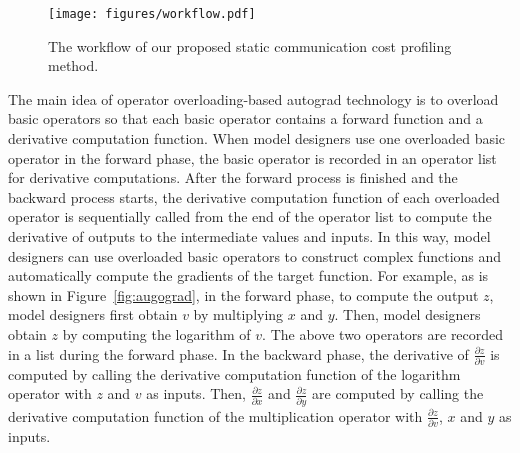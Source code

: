 \begin{figure*}[htbp]
    \centering
    \texttt{[image: figures/workflow.pdf]}
    \caption{The workflow of our proposed static communication cost profiling method. }
    \label{fig:workflow}
\end{figure*}
The main idea of operator overloading-based autograd technology is to overload basic operators so that each basic operator contains a forward function and a derivative computation function. When model designers use one overloaded basic operator in the forward phase, the basic operator is recorded in an operator list for derivative computations. After the forward process is finished and the backward process starts, the derivative computation function of each overloaded operator is sequentially called from the end of the operator list to compute the derivative of outputs to the intermediate values and inputs. In this way, model designers can use overloaded basic operators to construct complex functions and automatically compute the gradients of the target function. For example, as is shown in Figure~\ref{fig:augograd}, in the forward phase, to compute the output $z$, model designers first obtain $v$ by multiplying $x$ and $y$. Then, model designers obtain $z$ by computing the logarithm of $v$. The above two operators are recorded in a list during the forward phase. In the backward phase, the derivative of $\frac{\partial z}{\partial v}$ is computed by calling the derivative computation function of the logarithm operator with $z$ and $v$ as inputs. Then, $\frac{\partial z}{\partial x}$ and $\frac{\partial z}{\partial y}$ are computed by calling the derivative computation function of the multiplication operator with $\frac{\partial z}{\partial v}$, $x$ and $y$ as inputs. 
 
